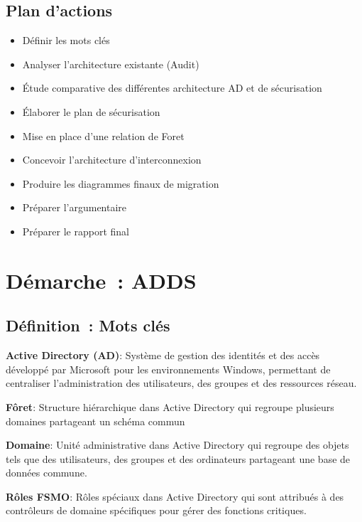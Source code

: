 \subsection*{Plan d'actions}
{}
\begin{itemize}
	\item Définir les mots clés
	\item Analyser l’architecture existante (Audit)
	\item Étude comparative des différentes architecture AD et de sécurisation
	\item Élaborer le plan de sécurisation
	\item Mise en place d’une relation de Foret
	\item Concevoir l'architecture d'interconnexion
	\item Produire les diagrammes finaux de migration
	\item Préparer l'argumentaire 
	\item Préparer le rapport final
\end{itemize}

\newpage
\section*{Démarche~: ADDS}


\subsection*{Définition~: Mots clés}
{}

\noindent \textbf{Active Directory (AD)}:
Système de gestion des identités et des accès développé par Microsoft pour les environnements Windows, permettant de centraliser l'administration des utilisateurs, des groupes et des ressources réseau.

\noindent \textbf{Fôret}:
Structure hiérarchique dans Active Directory qui regroupe plusieurs domaines partageant un schéma commun

\noindent \textbf{Domaine}:
Unité administrative dans Active Directory qui regroupe des objets tels que des utilisateurs, des groupes et des ordinateurs partageant une base de données commune.

\noindent \textbf{Rôles FSMO}:
Rôles spéciaux dans Active Directory qui sont attribués à des contrôleurs de domaine spécifiques pour gérer des fonctions critiques.

